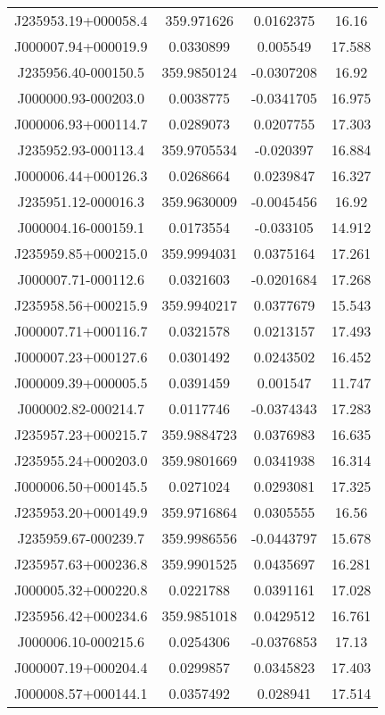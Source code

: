 \begin{table}
\begin{tabular}{cccc}
J235953.19+000058.4 & 359.971626 & 0.0162375 & 16.16 \\
J000007.94+000019.9 & 0.0330899 & 0.005549 & 17.588 \\
J235956.40-000150.5 & 359.9850124 & -0.0307208 & 16.92 \\
J000000.93-000203.0 & 0.0038775 & -0.0341705 & 16.975 \\
J000006.93+000114.7 & 0.0289073 & 0.0207755 & 17.303 \\
J235952.93-000113.4 & 359.9705534 & -0.020397 & 16.884 \\
J000006.44+000126.3 & 0.0268664 & 0.0239847 & 16.327 \\
J235951.12-000016.3 & 359.9630009 & -0.0045456 & 16.92 \\
J000004.16-000159.1 & 0.0173554 & -0.033105 & 14.912 \\
J235959.85+000215.0 & 359.9994031 & 0.0375164 & 17.261 \\
J000007.71-000112.6 & 0.0321603 & -0.0201684 & 17.268 \\
J235958.56+000215.9 & 359.9940217 & 0.0377679 & 15.543 \\
J000007.71+000116.7 & 0.0321578 & 0.0213157 & 17.493 \\
J000007.23+000127.6 & 0.0301492 & 0.0243502 & 16.452 \\
J000009.39+000005.5 & 0.0391459 & 0.001547 & 11.747 \\
J000002.82-000214.7 & 0.0117746 & -0.0374343 & 17.283 \\
J235957.23+000215.7 & 359.9884723 & 0.0376983 & 16.635 \\
J235955.24+000203.0 & 359.9801669 & 0.0341938 & 16.314 \\
J000006.50+000145.5 & 0.0271024 & 0.0293081 & 17.325 \\
J235953.20+000149.9 & 359.9716864 & 0.0305555 & 16.56 \\
J235959.67-000239.7 & 359.9986556 & -0.0443797 & 15.678 \\
J235957.63+000236.8 & 359.9901525 & 0.0435697 & 16.281 \\
J000005.32+000220.8 & 0.0221788 & 0.0391161 & 17.028 \\
J235956.42+000234.6 & 359.9851018 & 0.0429512 & 16.761 \\
J000006.10-000215.6 & 0.0254306 & -0.0376853 & 17.13 \\
J000007.19+000204.4 & 0.0299857 & 0.0345823 & 17.403 \\
J000008.57+000144.1 & 0.0357492 & 0.028941 & 17.514 \\

\end{tabular}
\end{table}
